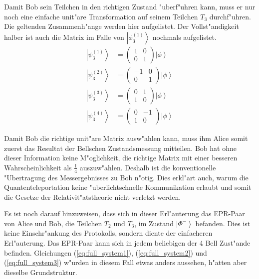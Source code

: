 \begin{refsection}
Damit Bob sein Teilchen in den richtigen Zustand "uberf"uhren kann, muss er nur noch eine einfache unit"are Transformation auf seinem Teilchen $T_{3}$ durchf"uhren. Die geltenden Zusammenh"ange werden hier aufgelistet. Der Vollst"andigkeit halber ist auch die Matrix im Falle von $\left|\phi_{3}^{(1)}\right\rangle$ nochmals aufgelistet.
\begin{align}
	\left| \psi_{3}^{(1)} \right \rangle & = \begin{pmatrix} 1 & 0 \\ 0 & 1 \end{pmatrix} \left| \phi \right \rangle \\
	\left| \psi_{3}^{(2)} \right \rangle & = \begin{pmatrix} -1 & 0 \\ 0 & 1 \end{pmatrix} \left| \phi \right \rangle \\
	\left| \psi_{3}^{(3)} \right \rangle & = \begin{pmatrix} 0 & 1 \\ 1 & 0 \end{pmatrix} \left| \phi \right \rangle \\
	\left| \psi_{3}^{(4)} \right \rangle & = \begin{pmatrix} 0 & -1 \\ 1 & 0 \end{pmatrix} \left| \phi \right \rangle
\end{align}

Damit Bob die richtige unit"are Matrix ausw"ahlen kann, muss ihm Alice somit zuerst das Resultat der Bellschen Zustandsmessung mitteilen. Bob hat ohne dieser Information keine M"oglichkeit, die richtige Matrix mit einer besseren Wahrscheinlichkeit als $\frac{1}{4}$ auszuw"ahlen. Deshalb ist die konventionelle "Ubertragung des Messergebnisses zu Bob n"otig. Dies erkl"art auch, warum die  Quantenteleportation keine "uberlichtschnelle Kommunikation erlaubt und somit die Gesetze der Relativit"atstheorie nicht verletzt werden.

Es ist noch darauf hinzuweisen, dass sich in dieser Erl"auterung das EPR-Paar von Alice und Bob, die Teilchen $T_{2}$ und $T_{3}$, im Zustand $\left| \Phi^{-} \right\rangle$ befanden. Dies ist keine Einschr"ankung des Protokolls, sondern diente der einfacheren Erl"auterung. Das EPR-Paar kann sich in jedem beliebigen der 4 Bell Zust"ande befinden. Gleichungen (\ref{eq:full_system1}), (\ref{eq:full_system2}) und (\ref{eq:full_system3}) w"urden in diesem Fall etwas anders aussehen, h"atten aber dieselbe Grundstruktur.


\end{refsection}
